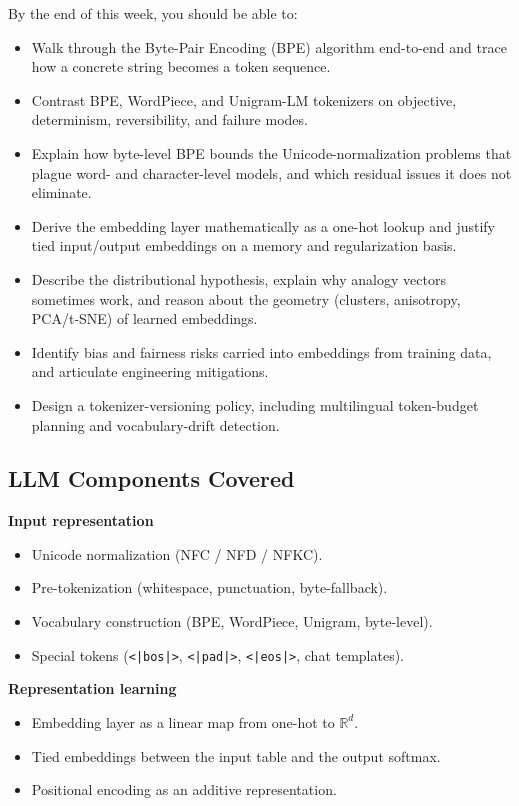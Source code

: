 By the end of this week, you should be able to:
\begin{itemize}
  \item Walk through the Byte-Pair Encoding (BPE) algorithm end-to-end
        and trace how a concrete string becomes a token sequence.
  \item Contrast BPE, WordPiece, and Unigram-LM tokenizers on
        objective, determinism, reversibility, and failure modes.
  \item Explain how byte-level BPE bounds the Unicode-normalization
        problems that plague word- and character-level models, and
        which residual issues it does not eliminate.
  \item Derive the embedding layer mathematically as a one-hot lookup
        and justify tied input/output embeddings on a memory and
        regularization basis.
  \item Describe the distributional hypothesis, explain why analogy
        vectors sometimes work, and reason about the geometry
        (clusters, anisotropy, PCA/t-SNE) of learned embeddings.
  \item Identify bias and fairness risks carried into embeddings from
        training data, and articulate engineering mitigations.
  \item Design a tokenizer-versioning policy, including multilingual
        token-budget planning and vocabulary-drift detection.
\end{itemize}

\subsection{LLM Components Covered}

\textbf{Input representation}
\begin{itemize}
  \item Unicode normalization (NFC / NFD / NFKC).
  \item Pre-tokenization (whitespace, punctuation, byte-fallback).
  \item Vocabulary construction (BPE, WordPiece, Unigram, byte-level).
  \item Special tokens (\texttt{<|bos|>}, \texttt{<|pad|>},
        \texttt{<|eos|>}, chat templates).
\end{itemize}

\textbf{Representation learning}
\begin{itemize}
  \item Embedding layer as a linear map from one-hot to $\mathbb{R}^d$.
  \item Tied embeddings between the input table and the output softmax.
  \item Positional encoding as an additive representation.
\end{itemize}

